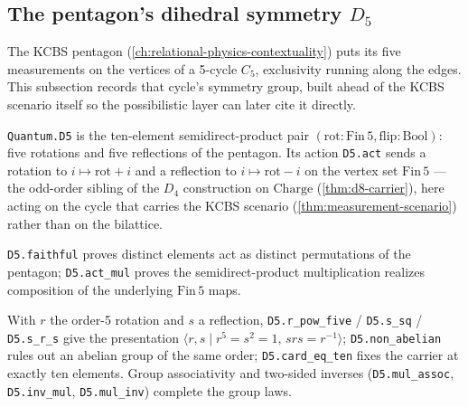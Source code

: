 \subsection{The pentagon's dihedral symmetry $D_5$}

The KCBS pentagon (\cref{ch:relational-physics-contextuality}) puts its five measurements on the
vertices of a 5-cycle $C_5$, exclusivity running along the edges. This subsection records that
cycle's symmetry group, built ahead of the KCBS scenario itself so the possibilistic layer can
later cite it directly.

\begin{proposition}\label{thm:d5-carrier}\leanok{}
\texttt{Quantum.D5} is the ten-element semidirect-product pair $(\mathrm{rot} : \mathrm{Fin}\,5,
\mathrm{flip} : \mathrm{Bool})$: five rotations and five reflections of the pentagon. Its action
\texttt{D5.act} sends a rotation to $i \mapsto \mathrm{rot} + i$ and a reflection to $i \mapsto
\mathrm{rot} - i$ on the vertex set $\mathrm{Fin}\,5$ --- the odd-order sibling of the $D_4$
construction on $\mathrm{Charge}$ (\cref{thm:d8-carrier}), here acting on the cycle that carries
the KCBS scenario (\cref{thm:measurement-scenario}) rather than on the bilattice.
\end{proposition}
\begin{theorem}\label{thm:d5-faithful-hom}\leanok{}
\texttt{D5.faithful} proves distinct elements act as distinct permutations of the pentagon;
\texttt{D5.act\_mul} proves the semidirect-product multiplication realizes composition of the
underlying $\mathrm{Fin}\,5$ maps.
\end{theorem}
\begin{theorem}\label{thm:d5-is-dihedral}\leanok{}
With $r$ the order-5 rotation and $s$ a reflection, \texttt{D5.r\_pow\_five} / \texttt{D5.s\_sq} /
\texttt{D5.s\_r\_s} give the presentation $\langle r, s \mid r^5 = s^2 = 1,\, srs = r^{-1}\rangle$;
\texttt{D5.non\_abelian} rules out an abelian group of the same order; \texttt{D5.card\_eq\_ten}
fixes the carrier at exactly ten elements. Group associativity and two-sided inverses
(\texttt{D5.mul\_assoc}, \texttt{D5.inv\_mul}, \texttt{D5.mul\_inv}) complete the group laws.
\end{theorem}
